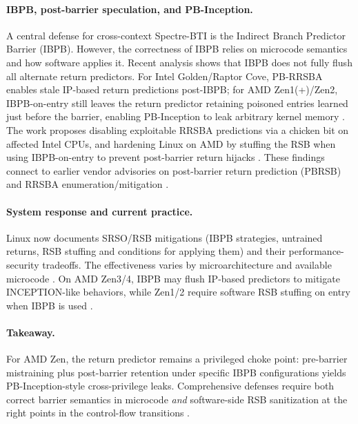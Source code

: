 \documentclass[11pt,a4paper]{article}
\begin{document}
\paragraph{IBPB, post-barrier speculation, and PB-Inception.}
A central defense for cross-context Spectre-BTI is the Indirect Branch Predictor Barrier (IBPB). However, the correctness of IBPB relies on microcode semantics and how software applies it. Recent analysis shows that IBPB does not fully flush all alternate return predictors. For Intel Golden/Raptor Cove, PB-RRSBA enables stale IP-based return predictions post-IBPB; for AMD Zen1(+)/Zen2, IBPB-on-entry still leaves the return predictor retaining poisoned entries learned just before the barrier, enabling PB-Inception to leak arbitrary kernel memory \cite{wikner2025breaking}. The work proposes disabling exploitable RRSBA predictions via a chicken bit on affected Intel CPUs, and hardening Linux on AMD by stuffing the RSB when using IBPB-on-entry to prevent post-barrier return hijacks \cite{wikner2025breaking}. These findings connect to earlier vendor advisories on post-barrier return prediction (PBRSB) and RRSBA enumeration/mitigation \cite{intel_pbrsb,intel_rrsba}.

\paragraph{System response and current practice.}
Linux now documents SRSO/RSB mitigations (IBPB strategies, untrained returns, RSB stuffing and conditions for applying them) and their performance-security tradeoffs. The effectiveness varies by microarchitecture and available microcode \cite{linux_srso_doc,linux_rsb_doc}. On AMD Zen3/4, IBPB may flush IP-based predictors to mitigate INCEPTION-like behaviors, while Zen1/2 require software RSB stuffing on entry when IBPB is used \cite{wikner2025breaking,amd_srso_whitepaper}.

\paragraph{Takeaway.}
For AMD Zen, the return predictor remains a privileged choke point: pre-barrier mistraining plus post-barrier retention under specific IBPB configurations yields PB-Inception-style cross-privilege leaks. Comprehensive defenses require both correct barrier semantics in microcode \emph{and} software-side RSB sanitization at the right points in the control-flow transitions \cite{wikner2025breaking,trujillo2023inception,linux_srso_doc}.
\end{document}
